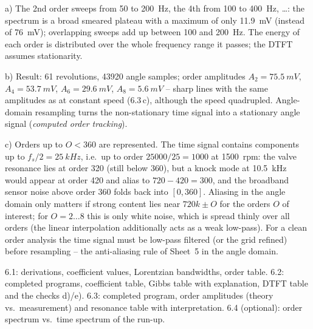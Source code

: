 \begin{solution}
a) The 2nd order sweeps from 50 to \SI{200}{Hz}, the 4th from 100 to
\SI{400}{Hz}, \dots: the spectrum is a broad smeared plateau with a maximum
of only \SI{11.9}{mV} (instead of \SI{76}{mV}); overlapping sweeps add up
between 100 and \SI{200}{Hz}. The energy of each order is distributed over the
whole frequency range it passes; the DTFT assumes stationarity.

b) 
Result: 61 revolutions, 43920 angle samples; order amplitudes
$A_2=\SI{75.5}{mV}$, $A_4=\SI{53.7}{mV}$, $A_6=\SI{29.6}{mV}$, $A_8=\SI{5.6}{mV}$ --
sharp lines with the same amplitudes as at constant speed (6.3\,c), although
the speed quadrupled. Angle-domain resampling turns the non-stationary time
signal into a stationary angle signal (\emph{computed order tracking}).

c) Orders up to $O<360$ are represented. The time signal contains components
up to $f_s/2=\SI{25}{kHz}$, i.e.\ up to order $25000/25=1000$ at
\SI{1500}{rpm}: the valve resonance lies at order 320 (still below 360), but a
knock mode at \SI{10.5}{kHz} would appear at order 420 and alias to
$720-420=300$, and the broadband sensor noise above order 360 folds back into
$[0,360]$. Aliasing in the angle domain only matters if strong content lies
near $720k\pm O$ for the orders $O$ of interest; for $O=2\dots8$ this is
only white noise, which is spread thinly over all orders (the linear
interpolation additionally acts as a weak low-pass). For a clean order
analysis the time signal must be low-pass filtered (or the grid refined)
before resampling -- the anti-aliasing rule of Sheet~5 in the angle domain.
\end{solution}

\begin{deliverables}
6.1: derivations, coefficient values, Lorentzian bandwidths, order table.
6.2: completed programs, coefficient table, Gibbs table with explanation,
DTFT table and the checks d)/e). 6.3: completed program, order amplitudes
(theory vs.\ measurement) and resonance table with interpretation.
6.4 (optional): order spectrum vs.\ time spectrum of the run-up.
\end{deliverables}
